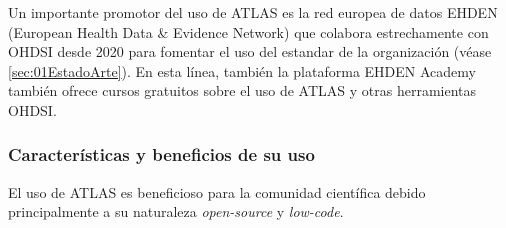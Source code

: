 Un importante promotor del uso de ATLAS es la red europea de datos EHDEN (European Health Data \& Evidence Network) \cite{ehden} que colabora estrechamente con OHDSI desde 2020 para fomentar el uso del estandar de la organización (véase \ref{sec:01EstadoArte}). En esta línea, también la plataforma EHDEN Academy también ofrece cursos gratuitos sobre el uso de ATLAS y otras herramientas OHDSI.

\subsubsection{Características y beneficios de su uso}

El uso de ATLAS es beneficioso para la comunidad científica debido principalmente a su naturaleza \textit{open-source} y \textit{low-code}. 

